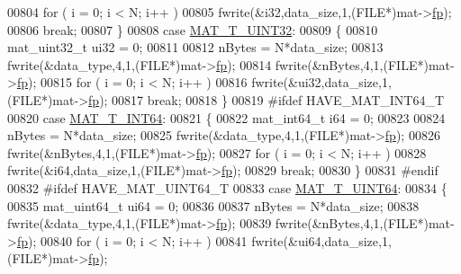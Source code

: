 \begin{DoxyCode}
{{{{00804             \textcolor{keywordflow}{for} ( i = 0; i < N; i++ )
00805                 fwrite(&i32,data\_size,1,(FILE*)mat->\hyperlink{struct__mat__t_a85f562e407ca9ad4d2a6e14f839432b7}{fp});
00806             \textcolor{keywordflow}{break};
00807         \}
00808         \textcolor{keywordflow}{case} \hyperlink{group___m_a_t_ggacf7b3b879282b7ab3a51190e49bf3453aa397e285a23fe240368b752897652c6a}{MAT\_T\_UINT32}:
00809         \{
00810             mat\_uint32\_t ui32 = 0;
00811 
00812             nBytes = N*data\_size;
00813             fwrite(&data\_type,4,1,(FILE*)mat->\hyperlink{struct__mat__t_a85f562e407ca9ad4d2a6e14f839432b7}{fp});
00814             fwrite(&nBytes,4,1,(FILE*)mat->\hyperlink{struct__mat__t_a85f562e407ca9ad4d2a6e14f839432b7}{fp});
00815             \textcolor{keywordflow}{for} ( i = 0; i < N; i++ )
00816                 fwrite(&ui32,data\_size,1,(FILE*)mat->\hyperlink{struct__mat__t_a85f562e407ca9ad4d2a6e14f839432b7}{fp});
00817             \textcolor{keywordflow}{break};
00818         \}
00819 \textcolor{preprocessor}{#ifdef HAVE\_MAT\_INT64\_T}
00820         \textcolor{keywordflow}{case} \hyperlink{group___m_a_t_ggacf7b3b879282b7ab3a51190e49bf3453a9e825b5d18b8f946eaf2b4b57e51c145}{MAT\_T\_INT64}:
00821         \{
00822             mat\_int64\_t i64 = 0;
00823 
00824             nBytes = N*data\_size;
00825             fwrite(&data\_type,4,1,(FILE*)mat->\hyperlink{struct__mat__t_a85f562e407ca9ad4d2a6e14f839432b7}{fp});
00826             fwrite(&nBytes,4,1,(FILE*)mat->\hyperlink{struct__mat__t_a85f562e407ca9ad4d2a6e14f839432b7}{fp});
00827             \textcolor{keywordflow}{for} ( i = 0; i < N; i++ )
00828                 fwrite(&i64,data\_size,1,(FILE*)mat->\hyperlink{struct__mat__t_a85f562e407ca9ad4d2a6e14f839432b7}{fp});
00829             \textcolor{keywordflow}{break};
00830         \}
00831 \textcolor{preprocessor}{#endif}
00832 \textcolor{preprocessor}{#ifdef HAVE\_MAT\_UINT64\_T}
00833         \textcolor{keywordflow}{case} \hyperlink{group___m_a_t_ggacf7b3b879282b7ab3a51190e49bf3453a45547932c46be27118abe08302d7e29f}{MAT\_T\_UINT64}:
00834         \{
00835             mat\_uint64\_t ui64 = 0;
00836 
00837             nBytes = N*data\_size;
00838             fwrite(&data\_type,4,1,(FILE*)mat->\hyperlink{struct__mat__t_a85f562e407ca9ad4d2a6e14f839432b7}{fp});
00839             fwrite(&nBytes,4,1,(FILE*)mat->\hyperlink{struct__mat__t_a85f562e407ca9ad4d2a6e14f839432b7}{fp});
00840             \textcolor{keywordflow}{for} ( i = 0; i < N; i++ )
00841                 fwrite(&ui64,data\_size,1,(FILE*)mat->\hyperlink{struct__mat__t_a85f562e407ca9ad4d2a6e14f839432b7}{fp});
}}}}
\end{DoxyCode}
